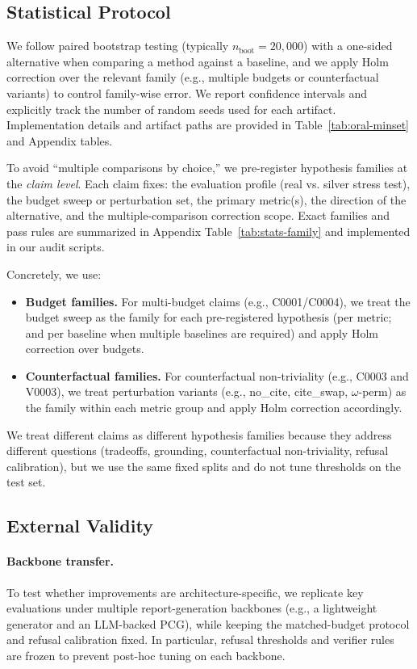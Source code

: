 \subsection{Statistical Protocol}
We follow paired bootstrap testing (typically $n_{\mathrm{boot}}{=}20{,}000$) with a one-sided alternative when comparing a method against a baseline, and we apply Holm correction over the relevant family (e.g., multiple budgets or counterfactual variants) to control family-wise error.
We report confidence intervals and explicitly track the number of random seeds used for each artifact.
Implementation details and artifact paths are provided in Table~\ref{tab:oral-minset} and Appendix tables.

To avoid ``multiple comparisons by choice,'' we pre-register hypothesis families at the \emph{claim level}.
Each claim fixes: the evaluation profile (real vs. silver stress test), the budget sweep or perturbation set, the primary metric(s), the direction of the alternative, and the multiple-comparison correction scope.
Exact families and pass rules are summarized in Appendix Table~\ref{tab:stats-family} and implemented in our audit scripts.

Concretely, we use:
\begin{itemize}
  \item \textbf{Budget families.} For multi-budget claims (e.g., C0001/C0004), we treat the budget sweep as the family for each pre-registered hypothesis (per metric; and per baseline when multiple baselines are required) and apply Holm correction over budgets.
  \item \textbf{Counterfactual families.} For counterfactual non-triviality (e.g., C0003 and V0003), we treat perturbation variants (e.g., no\_cite, cite\_swap, $\omega$-perm) as the family within each metric group and apply Holm correction accordingly.
\end{itemize}

We treat different claims as different hypothesis families because they address different questions (tradeoffs, grounding, counterfactual non-triviality, refusal calibration), but we use the same fixed splits and do not tune thresholds on the test set.

\subsection{External Validity}
\paragraph{Backbone transfer.}
To test whether improvements are architecture-specific, we replicate key evaluations under multiple report-generation backbones (e.g., a lightweight generator and an LLM-backed PCG), while keeping the matched-budget protocol and refusal calibration fixed.
In particular, refusal thresholds and verifier rules are frozen to prevent post-hoc tuning on each backbone.

